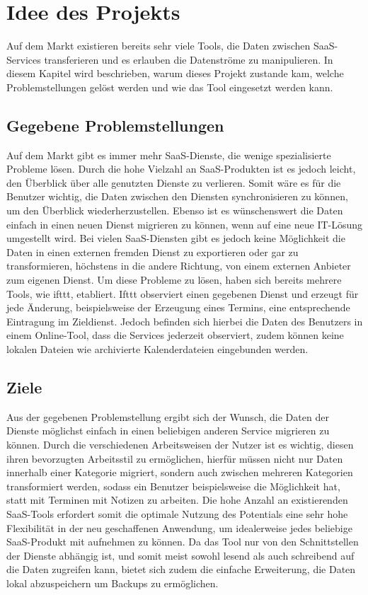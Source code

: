 \section{Idee des Projekts}
Auf dem Markt existieren bereits sehr viele Tools, die Daten zwischen SaaS-Services transferieren und es erlauben die Datenströme zu manipulieren. In diesem Kapitel wird beschrieben, warum dieses Projekt zustande kam, welche Problemstellungen gelöst werden und wie das Tool eingesetzt werden kann.

\subsection{Gegebene Problemstellungen}
Auf dem Markt gibt es immer mehr SaaS-Dienste, die wenige spezialisierte Probleme lösen. Durch die hohe Vielzahl an SaaS-Produkten ist es jedoch leicht, den Überblick über alle genutzten Dienste zu verlieren. Somit wäre es für die Benutzer wichtig, die Daten zwischen den Diensten synchronisieren zu können, um den Überblick wiederherzustellen. Ebenso ist es wünschenswert die Daten einfach in einen neuen Dienst migrieren zu können, wenn auf eine neue IT-Lösung umgestellt wird. Bei vielen SaaS-Diensten gibt es jedoch keine Möglichkeit die Daten in einen externen fremden Dienst zu exportieren oder gar zu transformieren, höchstens in die andere Richtung, von einem externen Anbieter zum eigenen Dienst. Um diese Probleme zu lösen, haben sich bereits mehrere Tools, wie ifttt, etabliert. Ifttt observiert einen gegebenen Dienst und erzeugt für jede Änderung, beispielsweise der Erzeugung eines Termins, eine entsprechende Eintragung im Zieldienst. Jedoch befinden sich hierbei die Daten des Benutzers in einem Online-Tool, dass die Services jederzeit observiert, zudem können keine lokalen Dateien wie archivierte Kalenderdateien eingebunden werden.


\subsection{Ziele}
Aus der gegebenen Problemstellung ergibt sich der Wunsch, die Daten der Dienste möglichst einfach in einen beliebigen anderen Service migrieren zu können. Durch die verschiedenen Arbeitsweisen der Nutzer ist es wichtig, diesen ihren bevorzugten Arbeitsstil zu ermöglichen, hierfür müssen nicht nur Daten innerhalb einer Kategorie migriert, sondern auch zwischen mehreren Kategorien transformiert werden, sodass ein Benutzer beispielsweise die Möglichkeit hat, statt mit Terminen mit Notizen zu arbeiten. Die hohe Anzahl an existierenden SaaS-Tools erfordert somit die optimale Nutzung des Potentials eine sehr hohe Flexibilität in der neu geschaffenen Anwendung, um idealerweise jedes beliebige SaaS-Produkt mit aufnehmen zu können. Da das Tool nur von den Schnittstellen der Dienste abhängig ist, und somit meist sowohl lesend als auch schreibend auf die Daten zugreifen kann, bietet sich zudem die einfache Erweiterung, die Daten lokal abzuspeichern um Backups zu ermöglichen.

